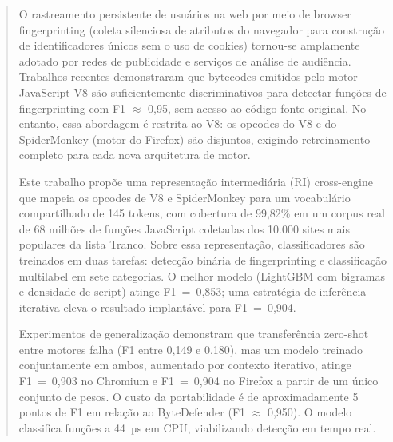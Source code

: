 
\begin{abstract}

O rastreamento persistente de usuários na web por meio de browser
fingerprinting (coleta silenciosa de atributos do navegador para construção
de identificadores únicos sem o uso de cookies) tornou-se amplamente
adotado por redes de publicidade e serviços de análise de audiência. Trabalhos
recentes demonstraram que bytecodes emitidos pelo motor JavaScript V8 são
suficientemente discriminativos para detectar funções de fingerprinting
com F1 $\approx$ 0,95, sem acesso ao código-fonte original. No entanto, essa
abordagem é restrita ao V8: os opcodes do V8 e do SpiderMonkey (motor do Firefox)
são disjuntos, exigindo retreinamento completo para cada nova arquitetura de motor.

Este trabalho propõe uma representação intermediária (RI) cross-engine que mapeia
os opcodes de V8 e SpiderMonkey para um vocabulário compartilhado de 145 tokens,
com cobertura de 99,82\% em um corpus real de 68 milhões de funções JavaScript
coletadas dos 10.000 sites mais populares da lista Tranco. Sobre essa
representação, classificadores são treinados em duas tarefas: detecção binária de
fingerprinting e classificação multilabel em sete categorias. O melhor
modelo (LightGBM com bigramas e densidade de script) atinge F1~=~0,853;
uma estratégia de inferência iterativa eleva o resultado implantável para
F1~=~0,904.

Experimentos de generalização demonstram que transferência zero-shot entre motores
falha (F1 entre 0,149 e 0,180), mas um modelo treinado conjuntamente em ambos, aumentado por contexto iterativo,
atinge F1~=~0,903 no Chromium e F1~=~0,904 no Firefox a partir de um único conjunto de
pesos. O custo da portabilidade é de aproximadamente 5 pontos de F1 em relação ao
ByteDefender (F1 $\approx$ 0,950). O modelo classifica funções a 44~µs em CPU,
viabilizando detecção em tempo real.

\end{abstract}

